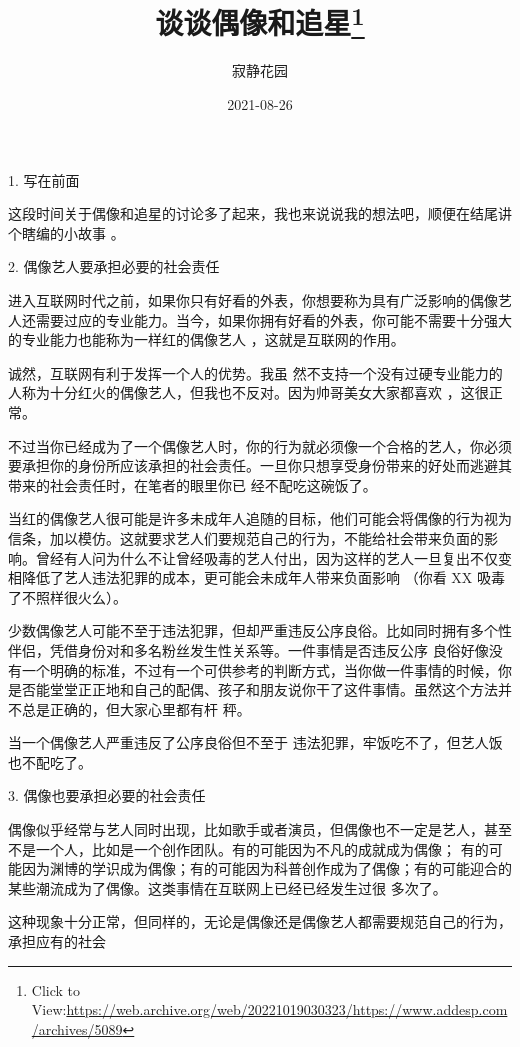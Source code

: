 \documentclass{article}
\title{谈谈偶像和追星\footnote{Click to View:\url{https://web.archive.org/web/20221019030323/https://www.addesp.com/archives/5089}}}
\author{寂静花园}
\date{2021-08-26}
\begin{document}

\maketitle


\Large


﻿1. 写在前面 

这段时间关于偶像和追星的讨论多了起来，我也来说说我的想法吧，顺便在结尾讲个瞎编的小故事
。 


2. 偶像艺人要承担必要的社会责任 

进入互联网时代之前，如果你只有好看的外表，你想要称为具有广泛影响的偶像艺人还需要过应的专业能力。当今，如果你拥有好看的外表，你可能不需要十分强大的专业能力也能称为一样红的偶像艺人
，这就是互联网的作用。 

诚然，互联网有利于发挥一个人的优势。我虽
\newpage
然不支持一个没有过硬专业能力的人称为十分红火的偶像艺人，但我也不反对。因为帅哥美女大家都喜欢
，这很正常。 

不过当你已经成为了一个偶像艺人时，你的行为就必须像一个合格的艺人，你必须要承担你的身份所应该承担的社会责任。一旦你只想享受身份带来的好处而逃避其带来的社会责任时，在笔者的眼里你已
经不配吃这碗饭了。 

当红的偶像艺人很可能是许多未成年人追随的目标，他们可能会将偶像的行为视为信条，加以模仿。这就要求艺人们要规范自己的行为，不能给社会带来负面的影响。曾经有人问为什么不让曾经吸毒的艺人付出，因为这样的艺人一旦复出不仅变相降低了艺人违法犯罪的成本，更可能会未成年人带来负面影响
（你看 XX 吸毒了不照样很火么）。 

少数偶像艺人可能不至于违法犯罪，但却严重违反公序良俗。比如同时拥有多个性伴侣，凭借身份对和多名粉丝发生性关系等。一件事情是否违反公序
\newpage
良俗好像没有一个明确的标准，不过有一个可供参考的判断方式，当你做一件事情的时候，你是否能堂堂正正地和自己的配偶、孩子和朋友说你干了这件事情。虽然这个方法并不总是正确的，但大家心里都有杆
秤。 

当一个偶像艺人严重违反了公序良俗但不至于
违法犯罪，牢饭吃不了，但艺人饭也不配吃了。 


3. 偶像也要承担必要的社会责任 

偶像似乎经常与艺人同时出现，比如歌手或者演员，但偶像也不一定是艺人，甚至不是一个人，比如是一个创作团队。有的可能因为不凡的成就成为偶像； 有的可能因为渊博的学识成为偶像；有的可能因为科普创作成为了偶像；有的可能迎合的某些潮流成为了偶像。这类事情在互联网上已经已经发生过很
多次了。 

这种现象十分正常，但同样的，无论是偶像还是偶像艺人都需要规范自己的行为，承担应有的社会
\newpage
\end{document}
